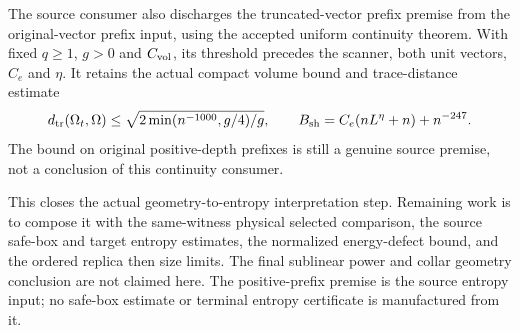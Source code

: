 The source consumer also discharges the truncated-vector prefix premise
from the original-vector prefix input, using the accepted uniform continuity
theorem.  With fixed $q\geq1$, $g>0$ and $C_{\rm vol}$, its threshold
precedes the scanner, both unit vectors, $C_e$ and $\eta$.  It retains the
actual compact volume bound and trace-distance estimate
\[
  d_{\rm tr}(\Omega_t,\Omega)\leq
  \sqrt{2\min(n^{-1000},g/4)/g},\qquad
  B_{\rm sh}=C_e(nL^\eta+n)+n^{-247}.
\]
The bound on original positive-depth prefixes is still a genuine source
premise, not a conclusion of this continuity consumer.

This closes the actual geometry-to-entropy interpretation step.  Remaining
work is to compose it with the same-witness physical selected comparison,
the source safe-box and target entropy estimates, the normalized
energy-defect bound, and the ordered replica then size limits.  The final
sublinear power and collar geometry conclusion are not claimed here.
The positive-prefix premise is the source entropy input; no safe-box
estimate or terminal entropy certificate is manufactured from it.
